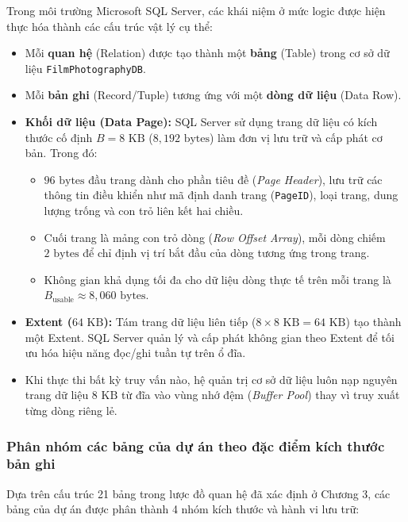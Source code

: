 Trong môi trường Microsoft SQL Server, các khái niệm ở mức logic được hiện thực hóa thành các cấu trúc vật lý cụ thể:
\begin{itemize}
    \item Mỗi \textbf{quan hệ} (Relation) được tạo thành một \textbf{bảng} (Table) trong cơ sở dữ liệu \texttt{FilmPhotographyDB}.
    \item Mỗi \textbf{bản ghi} (Record/Tuple) tương ứng với một \textbf{dòng dữ liệu} (Data Row).
    \item \textbf{Khối dữ liệu (Data Page):} SQL Server sử dụng trang dữ liệu có kích thước cố định $B = 8\text{ KB}$ ($8{,}192\text{ bytes}$) làm đơn vị lưu trữ và cấp phát cơ bản. Trong đó:
    \begin{itemize}
        \item $96\text{ bytes}$ đầu trang dành cho phần tiêu đề (\textit{Page Header}), lưu trữ các thông tin điều khiển như mã định danh trang (\texttt{PageID}), loại trang, dung lượng trống và con trỏ liên kết hai chiều.
        \item Cuối trang là mảng con trỏ dòng (\textit{Row Offset Array}), mỗi dòng chiếm $2\text{ bytes}$ để chỉ định vị trí bắt đầu của dòng tương ứng trong trang.
        \item Không gian khả dụng tối đa cho dữ liệu dòng thực tế trên mỗi trang là $B_{\text{usable}} \approx 8{,}060\text{ bytes}$.
    \end{itemize}
    \item \textbf{Extent ($64\text{ KB}$):} Tám trang dữ liệu liên tiếp ($8 \times 8\text{ KB} = 64\text{ KB}$) tạo thành một Extent. SQL Server quản lý và cấp phát không gian theo Extent để tối ưu hóa hiệu năng đọc/ghi tuần tự trên ổ đĩa.
    \item Khi thực thi bất kỳ truy vấn nào, hệ quản trị cơ sở dữ liệu luôn nạp nguyên trang dữ liệu $8\text{ KB}$ từ đĩa vào vùng nhớ đệm (\textit{Buffer Pool}) thay vì truy xuất từng dòng riêng lẻ.
\end{itemize}

\subsubsection{Phân nhóm các bảng của dự án theo đặc điểm kích thước bản ghi}

Dựa trên cấu trúc 21 bảng trong lược đồ quan hệ đã xác định ở Chương 3, các bảng của dự án được phân thành 4 nhóm kích thước và hành vi lưu trữ:

